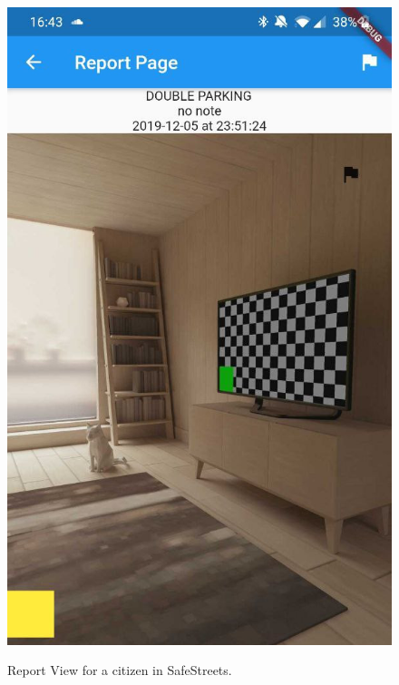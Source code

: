 \documentclass[../RASD.tex]{subfiles}
\begin{document}
    \begin{figure}[H]
        \centering
        \includegraphics[scale = 0.2]{assets/app_screenshots/report.jpg}\\
        \caption[\textit{View Report Citizen} Screenshot]{Report View for a citizen in SafeStreets.}
    \end{figure}
\end{document}
